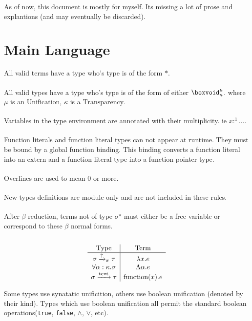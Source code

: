 \documentclass {article}
\begin{document}
As of now, this document is mostly for myself. Its missing a lot of prose and explantions (and may eventually be discarded). \\

\tableofcontents


\section{Main Language}
All valid terms have a type who's type is of the form $ * $. \\
\\
All valid types have a type who's type is of the form of either $ \boxvoid^\mu_\kappa $.
where $ \mu $ is an $ \text{Unification} $, $ \kappa $ is a $ \text{Transparency} $. \\
\\
Variables in the type environment are annotated with their multiplicity. ie $ x :^1 ... $. \\
\\
Function literals and function literal types can not appear at runtime. They must be bound by a global function binding.
This binding converts a function literal into an extern and a function literal type into a function pointer type. \\
\\
Overlines are used to mean 0 or more. \\
\\
New types definitions are module only and are not included in these rules. \\
\\
After $ \beta $ reduction, terms not of type $ \sigma^\pi $ must either be a free variable or correspond to these $ \beta $ normal forms. \\
\\
\begin{gather*}
\begin{array}{c | c}
\text{Type} & \text{Term} \\
\hline
\sigma \xrightarrow{\uparrow}_\pi \tau & \lambda x. e \\
\forall \alpha : \kappa. \sigma & \Lambda \alpha. e  \\
\sigma \xrightarrow{\text{text}} \tau & \text{function}(x). e \\
\end{array}
\end{gather*} 

Some types use synatatic unificition, others use boolean unification (denoted by their kind).
Types which use boolean unification all permit the standard boolean operations(\texttt{true}, \texttt{false}, $\land$, $\lor$, etc).
\end{document}
